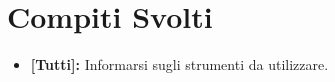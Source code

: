 \documentclass[../verbale-2016-12-07.tex]{subfiles}
\begin{document}
	\section{Compiti Svolti}
	\begin{itemize}
		\item \textbf{[Tutti]:} Informarsi sugli strumenti da utilizzare.
	\end{itemize}
\end{document}
